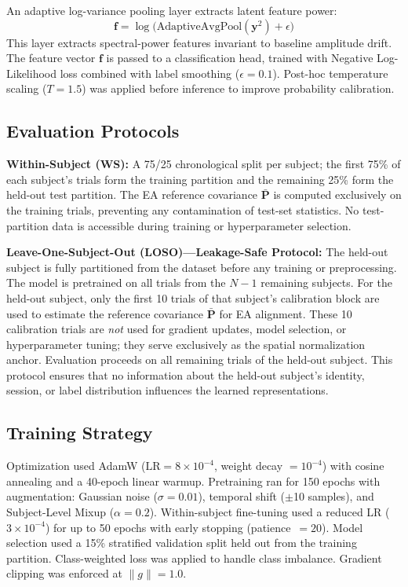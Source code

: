 \documentclass[11pt,a4paper]{article}
\begin{document}
An adaptive log-variance pooling layer extracts latent feature power:
\begin{equation}
    \mathbf{f} = \log\bigl(\mathrm{AdaptiveAvgPool}(\mathbf{y}^2) + \epsilon\bigr)
\end{equation}
This layer extracts spectral-power features invariant to baseline amplitude
drift.
The feature vector $\mathbf{f}$ is passed to a classification head, trained
with Negative Log-Likelihood loss combined with label smoothing
($\epsilon = 0.1$).
Post-hoc temperature scaling ($T = 1.5$) was applied before inference to
improve probability calibration.

\subsection{Evaluation Protocols}

\textbf{Within-Subject (WS):} A 75/25 chronological split per subject; the
first 75\% of each subject's trials form the training partition and the
remaining 25\% form the held-out test partition.
The EA reference covariance $\bar{\mathbf{P}}$ is computed exclusively on
the training trials, preventing any contamination of test-set statistics.
No test-partition data is accessible during training or hyperparameter
selection.

\textbf{Leave-One-Subject-Out (LOSO)---Leakage-Safe Protocol:}
The held-out subject is fully partitioned from the dataset before any training
or preprocessing.
The model is pretrained on all trials from the $N-1$ remaining subjects.
For the held-out subject, only the first 10 trials of that subject's
calibration block are used to estimate the reference covariance $\bar{\mathbf{P}}$
for EA alignment.
These 10 calibration trials are \emph{not} used for gradient updates, model
selection, or hyperparameter tuning; they serve exclusively as the spatial
normalization anchor.
Evaluation proceeds on all remaining trials of the held-out subject.
This protocol ensures that no information about the held-out subject's identity,
session, or label distribution influences the learned representations.

\subsection{Training Strategy}

Optimization used AdamW ($\text{LR} = 8\times10^{-4}$,
weight decay $= 10^{-4}$) with cosine annealing and a 40-epoch linear warmup.
Pretraining ran for 150 epochs with augmentation: Gaussian noise
($\sigma = 0.01$), temporal shift ($\pm$10 samples), and Subject-Level Mixup
($\alpha = 0.2$).
Within-subject fine-tuning used a reduced LR ($3\times10^{-4}$) for up to
50 epochs with early stopping (patience~$= 20$).
Model selection used a 15\% stratified validation split held out from the
training partition.
Class-weighted loss was applied to handle class imbalance.
Gradient clipping was enforced at $\lVert g \rVert = 1.0$.
\end{document}
